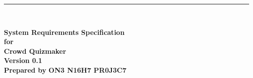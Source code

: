 \documentclass[a4paper, 12pt]{report}
\begin{document}
    \begin{titlepage}
        \noindent\rule{\textwidth}{5pt} \\
        \begin{flushright}
            \Huge\textbf{System Requirements Specification} \\[2\baselineskip]
            \large\textbf{for} \\
            \huge\textbf{Crowd Quizmaker} \\[2\baselineskip]
            \large\textbf{Version 0.1} \\[2\baselineskip]
            \large\textbf{Prepared by} \LARGE\textbf{ON3 N16H7 PR0J3C7} \\
        \end{flushright}
    \end{titlepage}
\end{document}
